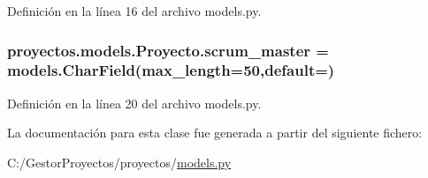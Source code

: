 Definición en la línea 16 del archivo models.\+py.

\subsubsection[{\texorpdfstring{scrum\+\_\+master}{scrum_master}}]{\setlength{\rightskip}{0pt plus 5cm}proyectos.\+models.\+Proyecto.\+scrum\+\_\+master = models.\+Char\+Field(max\+\_\+length=50,default=\textquotesingle{}\textquotesingle{})\hspace{0.3cm}{\ttfamily [static]}}\hypertarget{classproyectos_1_1models_1_1_proyecto_ac9da9a44762facf820f3158c2d9b012b}{}\label{classproyectos_1_1models_1_1_proyecto_ac9da9a44762facf820f3158c2d9b012b}


Definición en la línea 20 del archivo models.\+py.



La documentación para esta clase fue generada a partir del siguiente fichero\+:\begin{DoxyCompactItemize}
\item 
C\+:/\+Gestor\+Proyectos/proyectos/\hyperlink{proyectos_2models_8py}{models.\+py}\end{DoxyCompactItemize}
